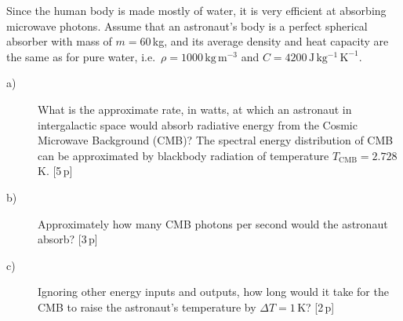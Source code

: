 Since the human body is made mostly of water, it is very efficient at
absorbing microwave photons. Assume that an astronaut's body is a perfect
spherical absorber with mass of $m = 60$\,kg, and its average density and heat
capacity are the same as for pure water, i.e.\
$\rho = 1000\,\mathrm{kg\,m^{-3}}$ and
$C = 4200\,\mathrm{J\,kg^{-1}\,K^{-1}}$.

\begin{description}
\item[a)] What is the approximate rate, in watts, at which an astronaut in
  intergalactic space would absorb radiative energy from the Cosmic Microwave
  Background (CMB)? The spectral energy distribution of CMB can be
  approximated by blackbody radiation of temperature
  $T_{\mathrm{CMB}} = 2.728$\,K. \hfill[5\,p]
\item[b)] Approximately how many CMB photons per second would the astronaut
  absorb? \hfill[3\,p]
\item[c)] Ignoring other energy inputs and outputs, how long would it take for
  the CMB to raise the astronaut's temperature by $\Delta T = 1$\,K?
  \hfill[2\,p]
\end{description}
